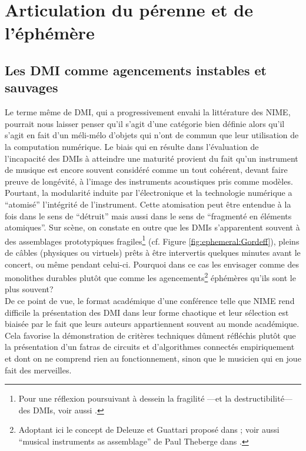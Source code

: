 \section{Articulation du pérenne et de l'éphémère}

\subsection{Les DMI comme agencements instables et sauvages}

\noindent Le terme même de \gls{DMI}, qui a progressivement envahi la littérature des \gls{NIME}, pourrait nous laisser penser qu'il s'agit d'une catégorie bien définie alors qu'il s'agit en fait d'un méli-mélo d'objets qui n'ont de commun que leur utilisation de la computation numérique. Le biais qui en résulte dans l'évaluation de l'incapacité des \glspl{DMI} à atteindre une maturité provient du fait qu'un instrument de musique est encore souvent considéré comme un tout cohérent, devant faire preuve de longévité, à l’image des instruments acoustiques pris comme modèles.\\
\indent Pourtant, la modularité induite par l'électronique et la technologie numérique a ``atomisé'' l'intégrité de l'instrument. Cette atomisation peut être entendue à la fois dans le sens de ``détruit'' mais aussi dans le sens de ``fragmenté en éléments atomiques''. Sur scène, on constate en outre que les \glspl{DMI} s'apparentent souvent à des assemblages prototypiques fragiles\footnote{Pour une réflexion poursuivant à dessein la fragilité —et la destructibilité— des \glspl{DMI}, voir aussi \cite{berthaut_wubbles:_2014, haddad_fragile_2017}.} (cf. Figure \ref{fig:ephemeral:Gordeff}), pleins de câbles (physiques ou virtuels) prêts à être intervertis quelques minutes avant le concert, ou même pendant celui-ci. Pourquoi dans ce cas les envisager comme des monolithes durables plutôt que comme les agencements\footnote{Adoptant ici le concept de Deleuze et Guattari proposé dans \cite{deleuze_mille_1980}; voir aussi ``musical instruments as assemblage'' de Paul Theberge dans \cite{bovermann_musical_2017}.} éphémères qu’ils sont le plus souvent?\\
\indent De ce point de vue, le format académique d'une conférence telle que \gls{NIME} rend difficile la présentation des \gls{DMI} dans leur forme chaotique et leur sélection est biaisée par le fait que leurs auteurs appartiennent souvent au monde académique. Cela favorise la démonstration de critères techniques dûment réfléchis plutôt que la présentation d'un fatras de circuits et d'algorithmes connectés empiriquement et dont on ne comprend rien au fonctionnement, sinon que le musicien qui en joue fait des merveilles.\\

